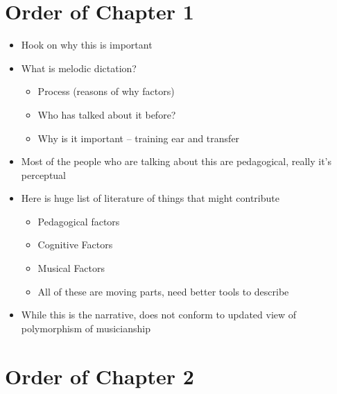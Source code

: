 \documentclass[]{book}
\providecommand{\tightlist}{%
  \setlength{\itemsep}{0pt}\setlength{\parskip}{0pt}}
\theoremstyle{definition}
\theoremstyle{definition}
\theoremstyle{definition}
\theoremstyle{remark}
\begin{document}
\hypertarget{order-of-chapter-1}{%
\section{Order of Chapter 1}\label{order-of-chapter-1}}

\begin{itemize}
\tightlist
\item
  Hook on why this is important
\item
  What is melodic dictation?

  \begin{itemize}
  \tightlist
  \item
    Process (reasons of why factors)
  \item
    Who has talked about it before?
  \item
    Why is it important -- training ear and transfer
  \end{itemize}
\item
  Most of the people who are talking about this are pedagogical, really
  it's perceptual
\item
  Here is huge list of literature of things that might contribute

  \begin{itemize}
  \tightlist
  \item
    Pedagogical factors
  \item
    Cognitive Factors
  \item
    Musical Factors
  \item
    All of these are moving parts, need better tools to describe
  \end{itemize}
\item
  While this is the narrative, does not conform to updated view of
  polymorphism of musicianship
\end{itemize}

\hypertarget{order-of-chapter-2}{%
\section{Order of Chapter 2}\label{order-of-chapter-2}}
\end{document}
